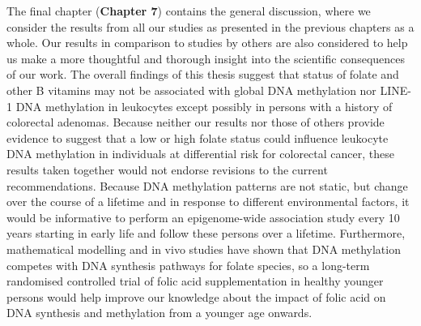 \noindent The final chapter (\textbf{Chapter 7}) contains the general discussion, where we consider the results from all our studies as presented in the previous chapters as a whole. Our results in comparison to studies by others are also considered to help us make a more thoughtful and thorough insight into the scientific consequences of our work. The overall findings of this thesis suggest that status of folate and other B vitamins may not be associated with global DNA methylation nor LINE-1 DNA methylation in leukocytes except possibly in persons with a history of colorectal adenomas. Because neither our results nor those of others provide evidence to suggest that a low or high folate status could influence leukocyte DNA methylation in individuals at differential risk for colorectal cancer, these results taken together would not endorse revisions to the current recommendations. Because DNA methylation patterns are not static, but change over the course of a lifetime and in response to different environmental factors, it would be informative to perform an epigenome-wide association study every 10 years starting in early life and follow these persons over a lifetime. Furthermore, mathematical modelling and in vivo studies have shown that DNA methylation competes with DNA synthesis pathways for folate species, so a long-term randomised controlled trial of folic acid supplementation in healthy younger persons would help improve our knowledge about the impact of folic acid on DNA synthesis and methylation from a younger age onwards.
